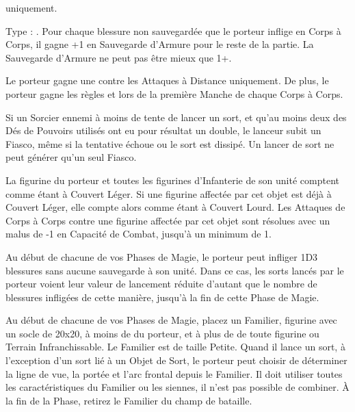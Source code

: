 \endpricelist

\armymagicalarmour

\startpricelist

\infantry{} uniquement.

Type : \ha{}. Pour chaque blessure non sauvegardée que le porteur inflige en Corps à Corps, il gagne +1 en Sauvegarde d'Armure pour le reste de la partie. La Sauvegarde d'Armure ne peut pas être mieux que 1+.

\endpricelist

\armytalismans

\startpricelist

Le porteur gagne une  contre les Attaques à Distance uniquement. De plus, le porteur gagne les règles  et  lors de la première Manche de chaque Corps à Corps.

Si un Sorcier ennemi à moins de  tente de lancer un sort, et qu'au moins deux des Dés de Pouvoirs utilisés ont eu pour résultat un double, le lanceur subit un Fiasco, même si la tentative échoue ou le sort est dissipé. Un lancer de sort ne peut générer qu'un seul Fiasco.

\endpricelist

\armyenchanteditems

\startpricelist

 La figurine du porteur et toutes les figurines d'Infanterie de son unité comptent comme étant à Couvert Léger. Si une figurine affectée par cet objet est déjà à Couvert Léger, elle compte alors comme étant à Couvert Lourd. Les Attaques de Corps à Corps contre une figurine affectée par cet objet sont résolues avec un malus de -1 en Capacité de Combat, jusqu'à un minimum de 1.

\endpricelist

\armyarcaneitems

\startpricelist

Au début de chacune de vos Phases de Magie, le porteur peut infliger 1D3 blessures sans aucune sauvegarde à son unité. Dans ce cas, les sorts lancés par le porteur voient leur valeur de lancement réduite d'autant que le nombre de blessures infligées de cette manière, jusqu'à la fin de cette Phase de Magie.

Au début de chacune de vos Phases de Magie, placez un Familier, figurine avec un socle de \unit{20x20}{\milli\meter}, à moins de  du porteur, et à plus de  de toute figurine ou Terrain Infranchissable. Le Familier est de taille Petite. Quand il lance un sort, à l'exception d'un sort lié à un Objet de Sort, le porteur peut choisir de déterminer la ligne de vue, la portée et l'arc frontal depuis le Familier. Il doit utiliser toutes les caractéristiques du Familier ou les siennes, il n'est pas possible de combiner. À la fin de la Phase, retirez le Familier du champ de bataille.

